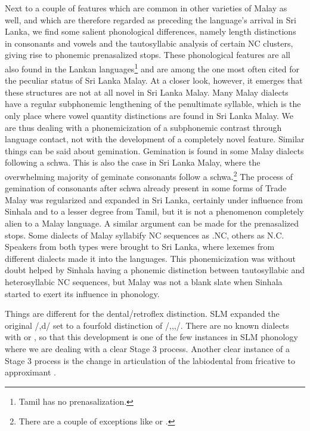 Next to a couple of features which are common in other varieties of Malay as well, and which are therefore regarded as preceding the language's arrival in Sri Lanka, we find some salient phonological differences, namely length distinctions in consonants and vowels and the tautosyllabic analysis of certain NC clusters, giving rise to phonemic prenasalized stops. These phonological features are all also found in the Lankan languages\footnote{Tamil has no prenasalization.} and are among the one most often cited for the peculiar status of Sri Lanka Malay. At a closer look, however, it emerges that these structures are not at all novel in Sri Lanka Malay. Many Malay dialects have a regular subphonemic lengthening of the penultimate syllable, which is the only place where vowel quantity distinctions are found in Sri Lanka Malay. We are thus dealing with a phonemicization of a subphonemic contrast through language contact, not with the development of a completely novel feature. Similar things can be said about gemination. Gemination is found in some Malay dialects following a schwa. This is also the case in Sri Lanka Malay, where the overwhelming majority of geminate consonants follow a schwa.\footnote{There 
 are a couple of exceptions like  or .
}
The process of gemination of consonants after schwa already present in some forms of Trade Malay was regularized and expanded in Sri Lanka, certainly under influence from Sinhala and to a lesser degree from Tamil, but it is not a phenomenon completely alien to a Malay language. A similar argument can be made for the prenasalized stops. Some dialects of Malay syllabify NC sequences as .NC, others as N.C. Speakers from both types were brought to Sri Lanka, where lexemes from different dialects made it into the languages. This phonemicization was without doubt helped by Sinhala having a phonemic distinction between tautosyllabic and heterosyllabic NC sequences, but Malay was not a blank slate when Sinhala started to exert its influence in phonology.

Things are different for the dental/retroflex distinction. SLM expanded the original /\dentt,d/ set to a fourfold distinction of /\dentt,\tz,\dentd,\dz/. There are no known dialects with \tz{} or \dentd, so that this development is one of the few instances in SLM phonology where we are dealing with a clear Stage 3 process. Another clear instance of a Stage 3 process is the change in articulation of the labiodental from fricative  to approximant . 

